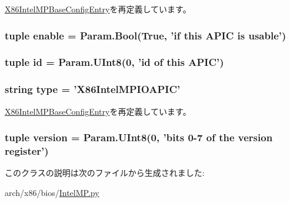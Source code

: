 \hyperlink{classIntelMP_1_1X86IntelMPBaseConfigEntry_a17da7064bc5c518791f0c891eff05fda}{X86IntelMPBaseConfigEntry}を再定義しています。\hypertarget{classIntelMP_1_1X86IntelMPIOAPIC_abe5c47d3a1803e0ccf098c3dc333116a}{
\subsubsection[{enable}]{\setlength{\rightskip}{0pt plus 5cm}tuple {\bf enable} = Param.Bool(True, 'if this APIC is usable')}}
\label{classIntelMP_1_1X86IntelMPIOAPIC_abe5c47d3a1803e0ccf098c3dc333116a}
\hypertarget{classIntelMP_1_1X86IntelMPIOAPIC_a0e43f6071072440917ee2dd8af07d251}{
\subsubsection[{id}]{\setlength{\rightskip}{0pt plus 5cm}tuple {\bf id} = Param.UInt8(0, '{\bf id} of this APIC')}}
\label{classIntelMP_1_1X86IntelMPIOAPIC_a0e43f6071072440917ee2dd8af07d251}
\hypertarget{classIntelMP_1_1X86IntelMPIOAPIC_acce15679d830831b0bbe8ebc2a60b2ca}{
\subsubsection[{type}]{\setlength{\rightskip}{0pt plus 5cm}string {\bf type} = '{\bf X86IntelMPIOAPIC}'}}
\label{classIntelMP_1_1X86IntelMPIOAPIC_acce15679d830831b0bbe8ebc2a60b2ca}


\hyperlink{classIntelMP_1_1X86IntelMPBaseConfigEntry_acce15679d830831b0bbe8ebc2a60b2ca}{X86IntelMPBaseConfigEntry}を再定義しています。\hypertarget{classIntelMP_1_1X86IntelMPIOAPIC_a76aa01cd80eeb03b381ebe36f17c16b2}{
\subsubsection[{version}]{\setlength{\rightskip}{0pt plus 5cm}tuple {\bf version} = Param.UInt8(0, 'bits 0-\/7 of the {\bf version} register')}}
\label{classIntelMP_1_1X86IntelMPIOAPIC_a76aa01cd80eeb03b381ebe36f17c16b2}


このクラスの説明は次のファイルから生成されました:\begin{DoxyCompactItemize}
\item 
arch/x86/bios/\hyperlink{IntelMP_8py}{IntelMP.py}\end{DoxyCompactItemize}
